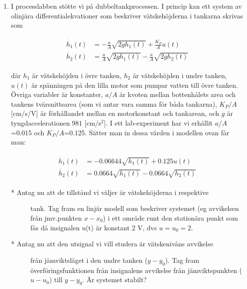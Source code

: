 \begin{enumerate}
\item
  I processlabben stötte vi på dubbeltankprocessen. I princip kan ett
  system av olinjära differentialekvationer som beskriver vätskehöjderna
  i tankarna skrivas som

  \[\begin{aligned}
  \begin{aligned}
  \dot{h_1}(t)&=-\frac{a}{A}\sqrt{2 g h_1(t)}+\frac{K_P}{A}u(t)\\
  \dot{h_2}(t)&=\frac{a}{A}\sqrt{2 g h_1(t)}-\frac{a}{A}\sqrt{2 g h_2(t)}
  \end{aligned}
  \end{aligned}\]

  där \(h_1\) är vätskehöjden i övre tanken, \(h_2\) är vätskehöjden i
  undre tanken, \(u(t)\) är spänningen på den lilla motor som pumpar
  vatten till övre tanken. Övriga variabler är konstanter, \(a/A\) är
  kvoten mellan bottenhålets area och tankens tvärsnittsarea (som vi
  antar vara samma för båda tankarna), \(K_P/A\) {[}cm/s/V{]} är
  förhållandet mellan en motorkonstant och tankarean, och \(g\) är
  tyngdaccelerationen \(981\) {[}cm/s\(^2\){]}. I ett lab-experiment har
  vi erhållit \(a/A\)=0.015 och \(K_P/A\)=0.125. Sätter man in dessa
  värden i modellen ovan får man:

  \[\begin{aligned}
  \begin{aligned}
  \dot{h_1}(t)&=-0.06644\sqrt{h_1(t)}+0.125u(t)\\
  \dot{h_2}(t)&=0.0664\sqrt{h_1(t)}-0.0664\sqrt{h_2(t)}
  \end{aligned}
  \end{aligned}\]

  \begin{description}
  \item[* Antag nu att de tillstånd vi väljer är vätskehöjderna i
  respektive]
  tank. Tag fram en linjär modell som beskriver systemet (eg avvikelsen
  från jmv.punkten \(x-x_0\)) i ett område runt den stationära punkt som
  fås då insignalen u(t) är konstant 2 V, dvs \(u=u_0=2\).
  \item[* Antag nu att den utsignal vi vill studera är vätskenivåns
  avvikelse]
  från jämviktsläget i den undre tanken (\(y-y_0\)). Tag fram
  överföringsfunktionen från insignalens avvikelse från jämviktspunkten
  (\(u-u_0\)) till \(y-y_0\). Är systemet stabilt?
  \end{description}
\end{enumerate}
